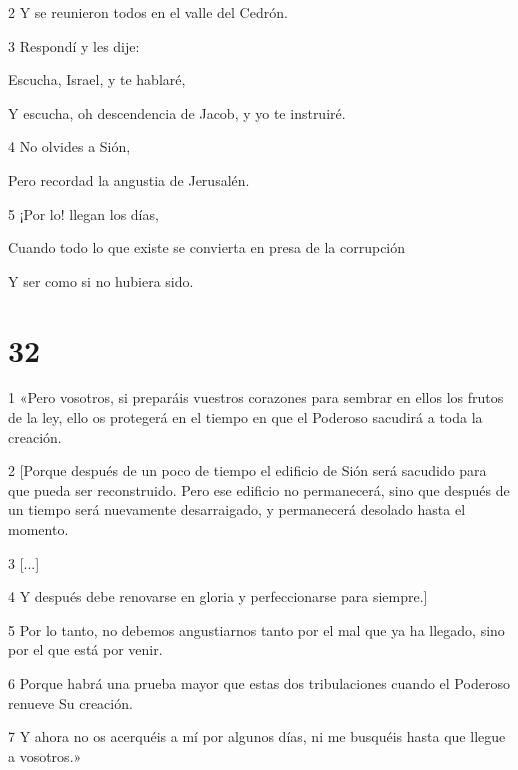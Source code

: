 \par 2 Y se reunieron todos en el valle del Cedrón.

\par 3 Respondí y les dije:

\par Escucha, Israel, y te hablaré,

\par Y escucha, oh descendencia de Jacob, y yo te instruiré.

\par 4 No olvides a Sión,

\par Pero recordad la angustia de Jerusalén.

\par 5 ¡Por lo! llegan los días,

\par Cuando todo lo que existe se convierta en presa de la corrupción

\par Y ser como si no hubiera sido.

\chapter{32}

\par 1 «Pero vosotros, si preparáis vuestros corazones para sembrar en ellos los frutos de la ley, ello os protegerá en el tiempo en que el Poderoso sacudirá a toda la creación.

\par 2 [Porque después de un poco de tiempo el edificio de Sión será sacudido para que pueda ser reconstruido. Pero ese edificio no permanecerá, sino que después de un tiempo será nuevamente desarraigado, y permanecerá desolado hasta el momento.

\par 3 [...]

\par 4 Y después debe renovarse en gloria y perfeccionarse para siempre.]

\par 5 Por lo tanto, no debemos angustiarnos tanto por el mal que ya ha llegado, sino por el que está por venir.

\par 6 Porque habrá una prueba mayor que estas dos tribulaciones cuando el Poderoso renueve Su creación.

\par 7 Y ahora no os acerquéis a mí por algunos días, ni me busquéis hasta que llegue a vosotros.»

